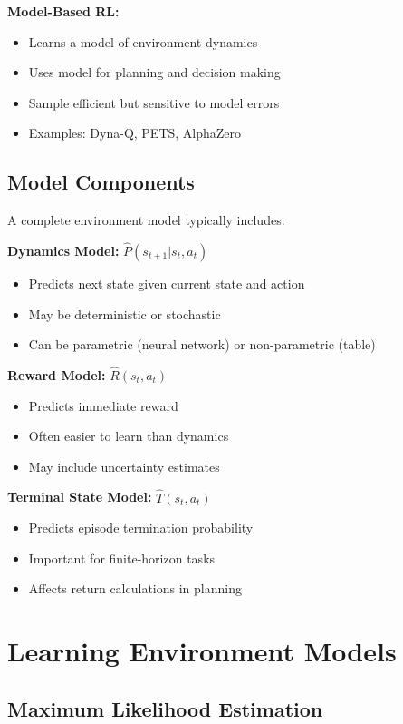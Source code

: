 \textbf{Model-Based RL:}
\begin{itemize}
    \item Learns a model of environment dynamics
    \item Uses model for planning and decision making
    \item Sample efficient but sensitive to model errors
    \item Examples: Dyna-Q, PETS, AlphaZero
\end{itemize}

\subsection{Model Components}

A complete environment model typically includes:

\textbf{Dynamics Model:} $\hat{P}(s_{t+1}|s_t, a_t)$
\begin{itemize}
    \item Predicts next state given current state and action
    \item May be deterministic or stochastic
    \item Can be parametric (neural network) or non-parametric (table)
\end{itemize}

\textbf{Reward Model:} $\hat{R}(s_t, a_t)$
\begin{itemize}
    \item Predicts immediate reward
    \item Often easier to learn than dynamics
    \item May include uncertainty estimates
\end{itemize}

\textbf{Terminal State Model:} $\hat{T}(s_t, a_t)$
\begin{itemize}
    \item Predicts episode termination probability
    \item Important for finite-horizon tasks
    \item Affects return calculations in planning
\end{itemize}

\section{Learning Environment Models}

\subsection{Maximum Likelihood Estimation}

